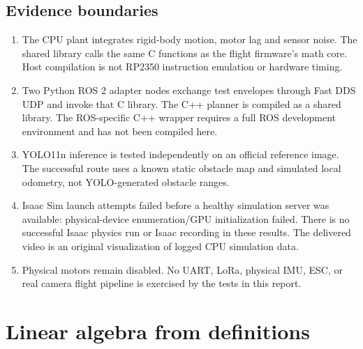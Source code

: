 \section{Evidence boundaries}
\begin{enumerate}
\item The CPU plant integrates rigid-body motion, motor lag and sensor noise.
The shared library calls the same C functions as the flight firmware's math
core. Host compilation is not RP2350 instruction emulation or hardware timing.
\item Two Python ROS 2 adapter nodes exchange test envelopes through Fast DDS
UDP and invoke that C library. The C++ planner is compiled as a shared library.
The ROS-specific C++ wrapper requires a full ROS development environment and
has not been compiled here.
\item YOLO11n inference is tested independently on an official reference image.
The successful route uses a known static obstacle map and simulated local
odometry, not YOLO-generated obstacle ranges.
\item Isaac Sim launch attempts failed before a healthy simulation server was
available: physical-device enumeration/GPU initialization failed. There is no
successful Isaac physics run or Isaac recording in these results. The delivered
video is an original visualization of logged CPU simulation data.
\item Physical motors remain disabled. No UART, LoRa, physical IMU, ESC, or real
camera flight pipeline is exercised by the tests in this report.
\end{enumerate}

\chapter{Linear algebra from definitions}
